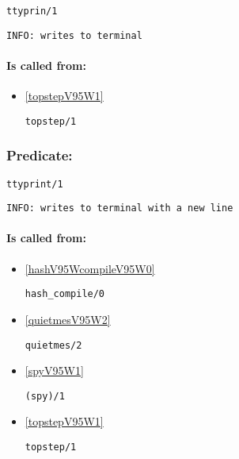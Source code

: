 \begin{verbatim}
ttyprin/1
\end{verbatim}

{\small \begin{verbatim}
INFO: writes to terminal

\end{verbatim}}
\paragraph{Is called from:} 
\begin{itemize}
\item \ref{topstepV95W1} 
\begin{verbatim}
topstep/1
\end{verbatim}

\end{itemize}

\subsubsection{Predicate:} \label{ttyprintV95W1}

\begin{verbatim}
ttyprint/1
\end{verbatim}

{\small \begin{verbatim}
INFO: writes to terminal with a new line

\end{verbatim}}
\paragraph{Is called from:} 
\begin{itemize}
\item \ref{hashV95WcompileV95W0} 
\begin{verbatim}
hash_compile/0
\end{verbatim}

\item \ref{quietmesV95W2} 
\begin{verbatim}
quietmes/2
\end{verbatim}

\item \ref{spyV95W1} 
\begin{verbatim}
(spy)/1
\end{verbatim}

\item \ref{topstepV95W1} 
\begin{verbatim}
topstep/1
\end{verbatim}

\end{itemize}

